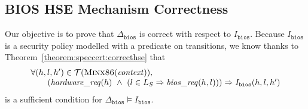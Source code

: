 \subsection{BIOS HSE Mechanism Correctness}
\label{subsec:speccert2:bioshsecorrect}

Our objective is to prove that \( \Delta_{\mathtt{bios}} \) is correct with
respect to \( I_{\mathtt{bios}} \).
%
Because \( I_{\mathtt{bios}} \) is a security policy modelled with a predicate
on transitions, we know thanks to Theorem~\ref{theorem:speccert:correcthse} that
%
\[
  \begin{array}{l}
    \forall (h, l, h') \in \mathcal{T}(\textsc{Minx86}(\mathit{context})), \\
    \qquad (\mathit{hardware\_req}(h)\ \wedge\ (l \in L_S \Rightarrow
    \mathit{bios\_req}(h, l))) \Rightarrow I_{\mathtt{bios}}(h, l, h')
  \end{array}
\]
%
is a sufficient condition for
\( \Delta_{\mathtt{bios}} \models I_{\mathtt{bios}} \).

